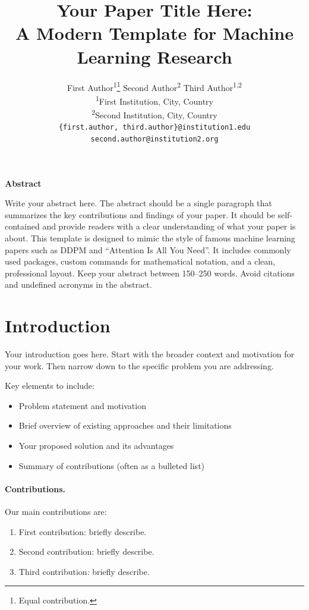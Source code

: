 \documentclass[10pt,a4paper,twocolumn]{article}
\title{\textbf{Your Paper Title Here: \\ A Modern Template for Machine Learning Research}}
\author{
    First Author\textsuperscript{1}\thanks{Equal contribution.} \quad
    Second Author\textsuperscript{2}\footnotemark[1] \quad
    Third Author\textsuperscript{1,2}
    \\[0.5em]
    \textsuperscript{1}First Institution, City, Country \\
    \textsuperscript{2}Second Institution, City, Country \\[0.5em]
    \texttt{\{first.author, third.author\}@institution1.edu} \\
    \texttt{second.author@institution2.org}
}
\date{}
\renewenvironment{abstract}{%
    \begin{center}
        \textbf{Abstract}
    \end{center}
    \vspace{-0.5em}
    \noindent\ignorespaces
}{\par\vspace{1em}}
\begin{document}
\twocolumn[
\begin{@twocolumnfalse}
\maketitle
\vspace{-1em}
\end{@twocolumnfalse}
]


\begin{abstract}
\noindent Write your abstract here. The abstract should be a single paragraph that summarizes the key contributions and findings of your paper. It should be self-contained and provide readers with a clear understanding of what your paper is about. This template is designed to mimic the style of famous machine learning papers such as DDPM and ``Attention Is All You Need''. It includes commonly used packages, custom commands for mathematical notation, and a clean, professional layout. Keep your abstract between 150--250 words. Avoid citations and undefined acronyms in the abstract.
\end{abstract}



\section{Introduction}
\label{sec:introduction}

Your introduction goes here. Start with the broader context and motivation for your work. Then narrow down to the specific problem you are addressing.

Key elements to include:
\begin{itemize}[nosep]
    \item Problem statement and motivation
    \item Brief overview of existing approaches and their limitations
    \item Your proposed solution and its advantages
    \item Summary of contributions (often as a bulleted list)
\end{itemize}

\paragraph{Contributions.} Our main contributions are:
\begin{enumerate}[nosep]
    \item First contribution: briefly describe.
    \item Second contribution: briefly describe.
    \item Third contribution: briefly describe.
\end{enumerate}
\end{document}
